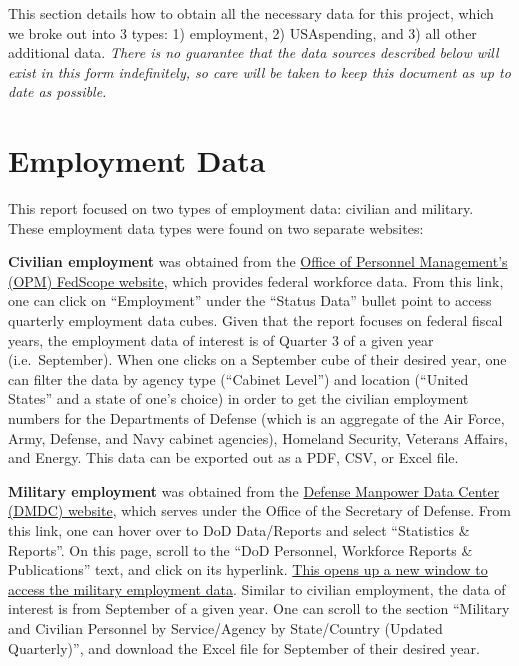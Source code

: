 \documentclass[
]{book}
\begin{document}
This section details how to obtain all the necessary data for this project, which we broke out into 3 types: 1) employment, 2) USAspending, and 3) all other additional data. \emph{There is no guarantee that the data sources described below will exist in this form indefinitely, so care will be taken to keep this document as up to date as possible.}

\hypertarget{employment-data}{%
\section{Employment Data}\label{employment-data}}

This report focused on two types of employment data: civilian and military. These employment data types were found on two separate websites:

\textbf{Civilian employment} was obtained from the \href{https://www.fedscope.opm.gov/}{Office of Personnel Management's (OPM) FedScope website}, which provides federal workforce data. From this link, one can click on ``Employment'' under the ``Status Data'' bullet point to access quarterly employment data cubes. Given that the report focuses on federal fiscal years, the employment data of interest is of Quarter 3 of a given year (i.e.~September). When one clicks on a September cube of their desired year, one can filter the data by agency type (``Cabinet Level'') and location (``United States'' and a state of one's choice) in order to get the civilian employment numbers for the Departments of Defense (which is an aggregate of the Air Force, Army, Defense, and Navy cabinet agencies), Homeland Security, Veterans Affairs, and Energy. This data can be exported out as a PDF, CSV, or Excel file.

\textbf{Military employment} was obtained from the \href{https://dwp.dmdc.osd.mil/dwp/app/main}{Defense Manpower Data Center (DMDC) website}, which serves under the Office of the Secretary of Defense. From this link, one can hover over to DoD Data/Reports and select ``Statistics \& Reports''. On this page, scroll to the ``DoD Personnel, Workforce Reports \& Publications'' text, and click on its hyperlink. \href{https://dwp.dmdc.osd.mil/dwp/app/DoD-data-reports/workforce-reports}{This opens up a new window to access the military employment data}. Similar to civilian employment, the data of interest is from September of a given year. One can scroll to the section ``Military and Civilian Personnel by Service/Agency by State/Country (Updated Quarterly)'', and download the Excel file for September of their desired year.
\end{document}
